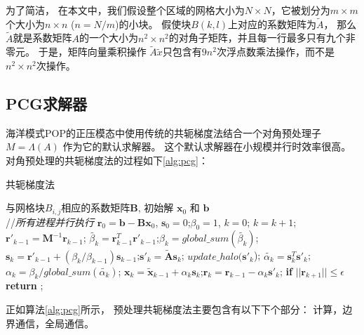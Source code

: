 为了简洁， 在本文中，我们假设整个区域的网格大小为$N\times N$，它被划分为$m\times m$个大小为$n\times n$ ($n=N/m$)的小块。 
假使块$B(k,l)$上对应的系数矩阵为$\tilde{A}$， 那么$\tilde{A}$就是系数矩阵$A$的一个大小为$n^2\times n^2$的对角子矩阵，并且每一行最多只有九个非零元。 
于是，矩阵向量乘积操作 $\tilde{A}\tilde{x}$只包含有$9n^2$次浮点数乘法操作，而不是$n^2\times n^2$次操作。 

\subsection{PCG求解器} 
\label{solver:pcg}
 
海洋模式POP的正压模态中使用传统的共轭梯度法结合一个对角预处理子$M = \Lambda(A)$ 作为它的默认求解器。 
这个默认求解器在小规模并行时效率很高。 
对角预处理的共轭梯度法的过程如下\ref{alg:pcg}： 

\begin{algorithm}[h]
\caption{共轭梯度法}
\label{alg:pcg}
\begin{algorithmic}[1]
\REQUIRE  与网格块$B_{i,j}$相应的系数矩阵$\textbf{B}$,  初始解 $\textbf{x}_0$ 和 $\textbf{b}$  \\
//\qquad    \textit{所有进程并行执行}
\STATE $\textbf{r}_0 = \textbf{b}-\textbf{B}\textbf{x}_0$, $\textbf{s}_0 =0$;\quad $\beta_0=1$, $k=0$;
\STATE $k=k+1$;\quad $\textbf{r}'_{k-1} =\textbf{M}^{-1}\textbf{r}_{k-1}$;\quad {}
\STATE $\tilde{\beta_k} = \textbf{r}_{k-1}^T\textbf{r}'_{k-1}$;\quad $\beta_k = global\_sum(\tilde{\beta_k})$; 
\STATE $\textbf{s}_k = \textbf{r}'_{k-1} +(\beta_k/\beta_{k-1})\textbf{s}_{k-1}$;\quad $\textbf{s}'_k = \tilde{\textbf{A}}\textbf{s}_k$; 
\STATE $update\_halo(\textbf{s}'_k$); 
\STATE $\tilde{\alpha_k} = \textbf{s}_k^T\textbf{s}'_k$;\quad $\alpha_k =\beta_k/ global\_sum(\tilde{\alpha_k})$;\quad {}
\STATE $\textbf{x}_k =\tilde{\textbf{x}}_{k-1} +\alpha_k \textbf{s}_k$;\quad $\textbf{r}_k =\textbf{r}_{k-1} -\alpha_k\textbf{s}'_k$;
\STATE \textbf{if} $||\textbf{r}_{k+1}|| \le \epsilon$  \textbf{return} ;
\ENDIF
\ENDWHILE
\end{algorithmic}
\end{algorithm}

 
正如算法\ref{alg:pcg}所示， 预处理共轭梯度法主要包含有以下下个部分： 计算，边界通信，全局通信。 
 

